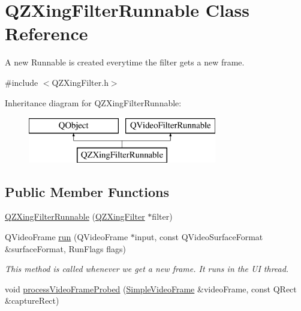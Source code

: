 \hypertarget{class_q_z_xing_filter_runnable}{}\section{Q\+Z\+Xing\+Filter\+Runnable Class Reference}
\label{class_q_z_xing_filter_runnable}


A new Runnable is created everytime the filter gets a new frame.  




{\ttfamily \#include $<$Q\+Z\+Xing\+Filter.\+h$>$}

Inheritance diagram for Q\+Z\+Xing\+Filter\+Runnable\+:\begin{figure}[H]
\begin{center}
\leavevmode
\includegraphics[height=2.000000cm]{class_q_z_xing_filter_runnable}
\end{center}
\end{figure}
\subsection*{Public Member Functions}
\begin{DoxyCompactItemize}
\item 
\mbox{\hyperlink{class_q_z_xing_filter_runnable_ae8ed468a251cc2daa6b251346c6c33e5}{Q\+Z\+Xing\+Filter\+Runnable}} (\mbox{\hyperlink{class_q_z_xing_filter}{Q\+Z\+Xing\+Filter}} $\ast$filter)
\item 
Q\+Video\+Frame \mbox{\hyperlink{class_q_z_xing_filter_runnable_a30cc32aa9a434b5d2ebfe3fcda4ad8cb}{run}} (Q\+Video\+Frame $\ast$input, const Q\+Video\+Surface\+Format \&surface\+Format, Run\+Flags flags)
\begin{DoxyCompactList}\small\item\em This method is called whenever we get a new frame. It runs in the UI thread. \end{DoxyCompactList}\item 
void \mbox{\hyperlink{class_q_z_xing_filter_runnable_a319ed1ef7b808ee6098e013c4f3387eb}{process\+Video\+Frame\+Probed}} (\mbox{\hyperlink{struct_simple_video_frame}{Simple\+Video\+Frame}} \&video\+Frame, const Q\+Rect \&capture\+Rect)
\end{DoxyCompactItemize}


